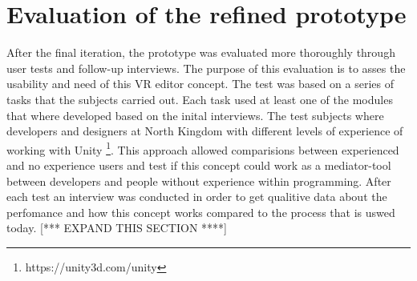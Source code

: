 \section{Evaluation of the refined prototype}
After the final iteration, the prototype was evaluated more thoroughly through user tests and follow-up interviews. The purpose of this evaluation is to asses the usability and need of this VR editor concept. The test was based on a series of tasks that the subjects carried out. Each task used at least one of the modules that where developed based on the inital interviews. The test subjects where developers and designers at North Kingdom with different levels of experience of working with Unity \footnote{https://unity3d.com/unity}. This approach allowed comparisions between experienced and no experience users and test if this concept could work as a mediator-tool between developers and people without experience within programming. After each test an interview was conducted in order to get qualitive data about the perfomance and how this concept works compared to the process that is uswed today. [*** EXPAND THIS SECTION ****]
